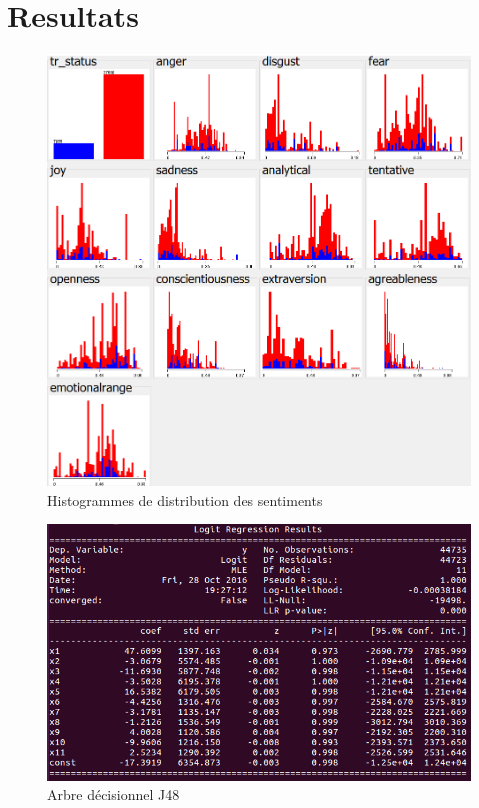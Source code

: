 \documentclass[10pt, conference]{IEEEtran}
\begin{document}
\section{Resultats}
\label{sec:resultats}

\begin{figure}[t]
  \includegraphics[width=\linewidth]{wekahisto.png}
  \caption{Histogrammes de distribution des sentiments}
  \label{fig:weka1}
\end{figure}

\begin{figure}[t]
  \includegraphics[width=\linewidth]{logit.png}
  \caption{Arbre décisionnel J48}
  \label{fig:logit}
\end{figure}
\end{document}
